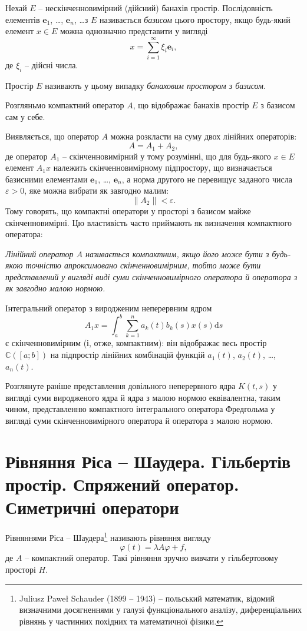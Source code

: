 \documentclass[14pt,twoside]{extreport}
\theoremstyle{mystyle}
\numberwithin{equation}{chapter}
\newcommand{\cab}{\mathbb{C}([a; b])}
\begin{document}
Нехай $E$ -- нескінченновимірний (дійсний) банахів простір. Послідовність елементів $\mathbf{e}_1$, \ldots, $\mathbf{e}_n$, \ldots з $E$ називається \emph{базисом} цього простору, якщо будь-який елемент $x\in E$ можна однозначно представити у вигляді
\[
 x=\sum_{i=1}^{\infty} \xi_i \mathbf{e}_i,
\]
де $\xi_i$ -- дійсні числа.

Простір $E$ називають у цьому випадку \emph{банаховим простором з базисом}.

Розгляньмо компактний оператор $A$, що відображає банахів простір $E$ з базисом сам у себе.

Виявляється, що оператор $A$ можна розкласти на суму двох лінійних операторів:
\[
 A=A_1 + A_2,
\]
де оператор $A_1$ -- скінченновимірний у тому розумінні, що для будь-якого $x \in E$ елемент $A_1 x$ належить скінченновимірному підпростору, що визначається базисними елементами $\mathbf{e}_1$, \ldots, $\mathbf{e}_n$, а норма другого не перевищує заданого числа $\varepsilon > 0$, яке можна вибрати як завгодно малим:
\[
 \|A_2\|<\varepsilon .
\]
Тому говорять, що компактні оператори у просторі з базисом майже скінченновимірні. Цю властивість часто приймають як визначення компактного оператора:

\emph{Лінійний оператор $A$ називається компактним, якщо його може бути з будь-якою точністю апроксимовано скінченновимірним, тобто може бути представлений у вигляді виді суми скінченновимірного оператора й оператора з як завгодно малою нормою.}

Інтегральний оператор з виродженим неперервним ядром
\[
 A_1 x = \int_{a}^{b} \sum_{k=1}^{n} a_k(t) b_k(s) x(s) \mathrm{d}s
\]
є скінченновимірним (і, отже, компактним): він відображає весь простір $\cab$ на підпростір лінійних комбінацій функцій $a_1(t)$, $a_2(t)$, \ldots, $a_n(t)$.

Розглянуте раніше представлення довільного неперервного ядра $K(t, s)$ у вигляді суми виродженого ядра й ядра з малою нормою еквівалентна, таким чином, представленню компактного інтегрального оператора Фредгольма у вигляді суми скінченновимірного оператора й оператора з малою нормою.

\section{Рівняння Ріса -- Шаудера. Гільбертів простір. Спряжений оператор. Симетричні оператори}

Рівняннями Ріса -- Шаудера\footnote{Juliusz Paweł Schauder (1899 -- 1943) -- польський математик, відомий визначними досягненнями у галузі функціонального аналізу, диференціальних рівнянь у частинних похідних та математичної фізики.} називають рівняння вигляду
\begin{equation}\label{riesz_shauder}
 \varphi (t) = \lambda A \varphi + f,
\end{equation}
де $A$ -- компактний оператор. Такі рівняння зручно вивчати у гільбертовому просторі $H$.
\end{document}
